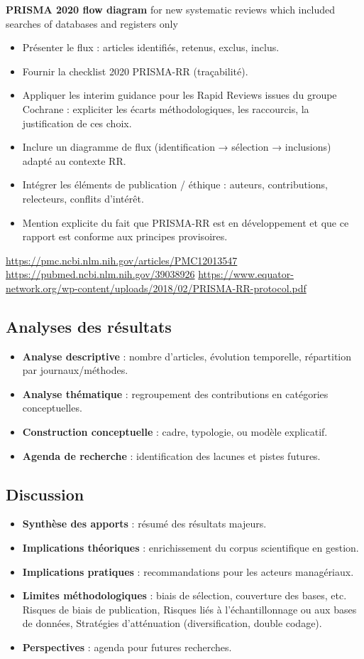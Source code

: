 \documentclass[a4paper,12pt]{article}
\begin{document}
\textbf{PRISMA 2020 flow diagram} for new systematic reviews which included searches of databases and registers only
\begin{itemize}
\item Présenter le flux : articles identifiés, retenus, exclus, inclus.
\item Fournir la checklist 2020 PRISMA-RR (traçabilité).
\item Appliquer les interim guidance pour les Rapid Reviews issues du groupe Cochrane : expliciter les écarts méthodologiques, les raccourcis, la justification de ces choix.
\item Inclure un diagramme de flux (identification → sélection → inclusions) adapté au contexte RR.
\item Intégrer les éléments de publication / éthique : auteurs, contributions, relecteurs, conflits d’intérêt.
\item Mention explicite du fait que PRISMA-RR est en développement et que ce rapport est conforme aux principes provisoires.
\end{itemize}
\url{https://pmc.ncbi.nlm.nih.gov/articles/PMC12013547}
\url{https://pubmed.ncbi.nlm.nih.gov/39038926}
\url{https://www.equator-network.org/wp-content/uploads/2018/02/PRISMA-RR-protocol.pdf}
\subsection{Analyses des résultats}
\label{sec:org30d40c6}
\begin{itemize}
\item \textbf{\textbf{Analyse descriptive}} : nombre d’articles, évolution temporelle, répartition par journaux/méthodes.
\item \textbf{\textbf{Analyse thématique}} : regroupement des contributions en catégories conceptuelles.
\item \textbf{\textbf{Construction conceptuelle}} : cadre, typologie, ou modèle explicatif.
\item \textbf{\textbf{Agenda de recherche}} : identification des lacunes et pistes futures.
\end{itemize}
\subsection{Discussion}
\label{sec:org32187ec}
\begin{itemize}
\item \textbf{\textbf{Synthèse des apports}} : résumé des résultats majeurs.
\item \textbf{\textbf{Implications théoriques}} : enrichissement du corpus scientifique en gestion.
\item \textbf{\textbf{Implications pratiques}} : recommandations pour les acteurs managériaux.
\item \textbf{\textbf{Limites méthodologiques}} : biais de sélection, couverture des bases, etc. Risques de biais de publication, Risques liés à l’échantillonnage ou aux bases de données, Stratégies d’atténuation (diversification, double codage).
\item \textbf{\textbf{Perspectives}} : agenda pour futures recherches.
\end{itemize}
\end{document}
